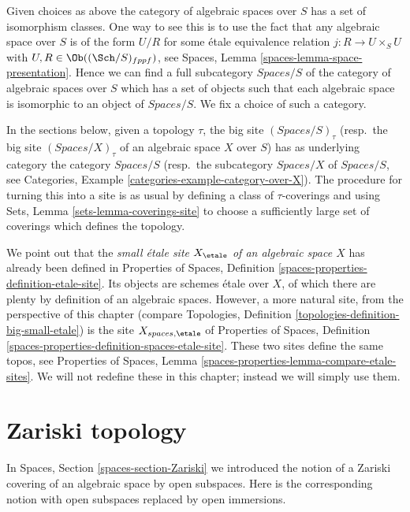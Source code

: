 \medskip\noindent
Given choices as above the category of algebraic spaces over $S$
has a set of isomorphism classes. One way to see this is to use the
fact that any algebraic space over $S$ is of the form $U/R$ for
some \'etale equivalence relation $j : R \to U \times_S U$ with
$U, R \in \Ob((\Sch/S)_{fppf})$, see
Spaces, Lemma \ref{spaces-lemma-space-presentation}.
Hence we can find a full subcategory $\textit{Spaces}/S$ of the category of
algebraic spaces over $S$ which has a set of objects
such that each algebraic space is isomorphic to an object of
$\textit{Spaces}/S$. We fix a choice of such a category.

\medskip\noindent
In the sections below, given a topology $\tau$, the big site
$(\textit{Spaces}/S)_\tau$ (resp.\ the big site $(\textit{Spaces}/X)_\tau$
of an algebraic space $X$ over $S$)
has as underlying category the category $\textit{Spaces}/S$
(resp.\ the subcategory $\textit{Spaces}/X$ of $\textit{Spaces}/S$, see
Categories, Example \ref{categories-example-category-over-X}).
The procedure for turning this into a site is as usual by defining a
class of $\tau$-coverings and using
Sets, Lemma \ref{sets-lemma-coverings-site}
to choose a sufficiently large set of coverings which defines the topology.

\medskip\noindent
We point out that the {\it small \'etale site $X_\etale$
of an algebraic space $X$} has already been defined in
Properties of Spaces, Definition
\ref{spaces-properties-definition-etale-site}.
Its objects are schemes \'etale over $X$, of which there are plenty
by definition of an algebraic spaces. However,
a more natural site, from the perspective of this chapter (compare
Topologies, Definition \ref{topologies-definition-big-small-etale})
is the site $X_{spaces, \etale}$ of
Properties of Spaces, Definition
\ref{spaces-properties-definition-spaces-etale-site}.
These two sites define the same topos, see
Properties of Spaces, Lemma \ref{spaces-properties-lemma-compare-etale-sites}.
We will not redefine these in this chapter; instead we will simply
use them.






\section{Zariski topology}
\label{section-zariski}

\noindent
In
Spaces, Section \ref{spaces-section-Zariski}
we introduced the notion of a Zariski covering of an algebraic space by
open subspaces. Here is the corresponding notion with open subspaces
replaced by open immersions.

